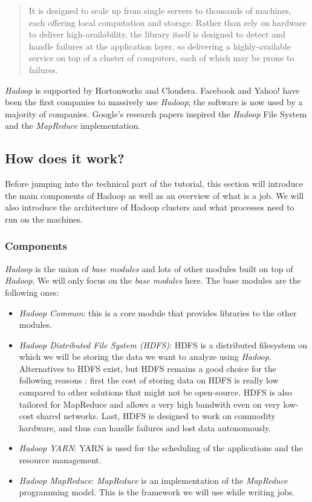\documentclass[a4paper, 12pt]{article}
\begin{document}
\begin{quote}
It is designed to scale up from single servers to thousands of machines, each offering local computation and storage. Rather than rely on hardware to deliver high-availability, the library itself is designed to detect and handle failures at the application layer, so delivering a highly-available service on top of a cluster of computers, each of which may be prone to failures.
\end{quote}

\textit{Hadoop} is supported by Hortonworks and Cloudera. Facebook and Yahoo! have been the first companies to massively use \textit{Hadoop}; the software is now used by a majority of companies. Google's research papers \cite{google_1} \cite{google_2} inspired the \textit{Hadoop} File System and the \textit{MapReduce} implementation.

  \subsection{How does it work?}

Before jumping into the technical part of the tutorial, this section will introduce the main components of Hadoop as well as an overview of what is a job. We will also introduce the architecture of Hadoop clusters and what processes need to run on the machines.

    \subsubsection{Components}
  
\textit{Hadoop} is the union of \textit{base modules} and lots of other modules built on top of \textit{Hadoop}. We will only focus on the \textit{base modules} here. The base modules are the following ones:
\begin{itemize}
  \item \textit{\textit{Hadoop} Common}: this is a core module that provides libraries to the other modules.
  \item \textit{\textit{Hadoop} Distributed File System (HDFS)}: HDFS is a distributed filesystem on which we will be storing the data we want to analyze using \textit{Hadoop}. Alternatives to HDFS exist, but HDFS remains a good choice for the following reasons \cite{horton}: first the cost of storing data on HDFS is really low compared to other solutions that might not be open-source. HDFS is also tailored for MapReduce and allows a very high bandwith even on very low-cost shared networks. Last, HDFS is designed to work on commodity hardware, and thus can handle failures and lost data autonomously.
  \item \textit{\textit{Hadoop} YARN}: YARN is used for the scheduling of the applications and the resource management.
  \item \textit{\textit{Hadoop} MapReduce}: \textit{MapReduce} is an implementation of the \textit{MapReduce} programming model. This is the framework we will use while writing jobs.
\end{itemize}
\end{document}
